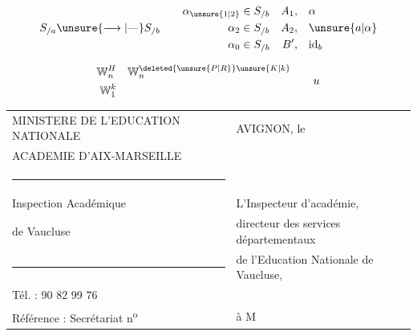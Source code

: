 

\[
S_{/a}\unsure{\longrightarrow|\text{---}}S_{/b}
\qquad
\begin{aligned}
\alpha_{\unsure{1|2}}&\in S_{/b} & A_1,&\quad\alpha\\
\alpha_2&\in S_{/b} & A_2,&\quad\unsure{a|\alpha}\\
\alpha_0&\in S_{/b} & B',&\quad\mathrm{id}_b
\end{aligned}
\]

\[
\begin{aligned}
\mathbb{W}_n^{H}&\quad\mathbb{W}_n^{\deleted{\unsure{P|R}}\unsure{K|k}}\\
\mathbb{W}_1^{k}&
\end{aligned}
\qquad u
\]

\noindent\begin{tabular}{@{}l@{\qquad}l@{}}
MINISTERE DE L'EDUCATION NATIONALE & AVIGNON, le\\
ACADEMIE D'AIX-MARSEILLE &\\
\multicolumn{1}{c}{\rule{1.1cm}{0.4pt}} &\\
Inspection Académique & L'Inspecteur d'académie,\\
de Vaucluse & directeur des services départementaux\\
\multicolumn{1}{c}{\rule{1.1cm}{0.4pt}} & de l'Education Nationale de Vaucluse,\\
Tél. : 90 82 99 76 &\\
Référence : Secrétariat n\textsuperscript{o} & à M
\end{tabular}

